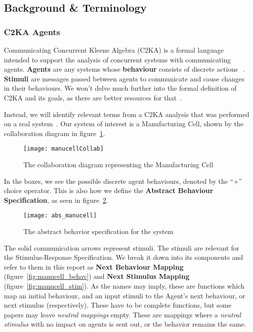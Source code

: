 \subsection{Background \& Terminology}\label{subsec:background-&-terminology}
\subsubsection{C2KA Agents}\label{subsubsec:c2ka-agents}
Communicating Concurrent Kleene Algebra (C2KA) is a formal language intended to support the analysis of concurrent systems with communicating agents. %
\textbf{Agents} are any systems whose \textbf{behaviour} consists of discrete actions ~\cite{c2ka_foundations}.
\textbf{Stimuli} are messages passed between agents to communicate and cause changes in their behaviours.
We won't delve much further into the formal definition of C2KA and its goals,
as there are better resources for that~\cite{c2ka_foundations, implicit_interactions}.

Instead, we will identify relevant terms from a C2KA analysis that was performed on a real system~\cite{manu_cell}.
Our system of interest is a Manufacturing Cell, shown by the collaboration diagram in figure~\ref{fig:manucell-collab}.
\begin{figure}
    \centering
    \texttt{[image: manucellCollab]}
    \caption{The collaboration diagram representing the Manufacturing Cell~\cite{manu_cell}}
    \label{fig:manucell-collab}
\end{figure}

In the boxes, we see the possible discrete agent behaviours, denoted by the ``+'' choice operator.
This is also how we define the \textbf{Abstract Behaviour Specification}, as seen in figure~\ref{fig:abstractmc}.
\begin{figure}
    \centering
    \texttt{[image: abs\_manucell]}
    \caption{The abstract behavior specification for the system~\cite{manu_cell}}
    \label{fig:abstractmc}
\end{figure}

The solid communication arrows represent stimuli.
The stimuli are relevant for the Stimulus-Response Specification.
We break it down into its components and refer to them in this report as \textbf{Next Behaviour Mapping} (figure~\ref{fig:manucell_behav})
and \textbf{Next Stimulus Mapping} (figure~\ref{fig:manucell_stim}).
As the names may imply, these are functions which map an initial behaviour, and an input stimuli to the Agent's next behaviour, or next stimulus (respectively).
These have to be complete functions, but some papers may leave \textit{neutral mappings} empty.
These are mappings where a \textit{neutral stimulus} with no impact on agents is sent out, or the behavior remains the same.

